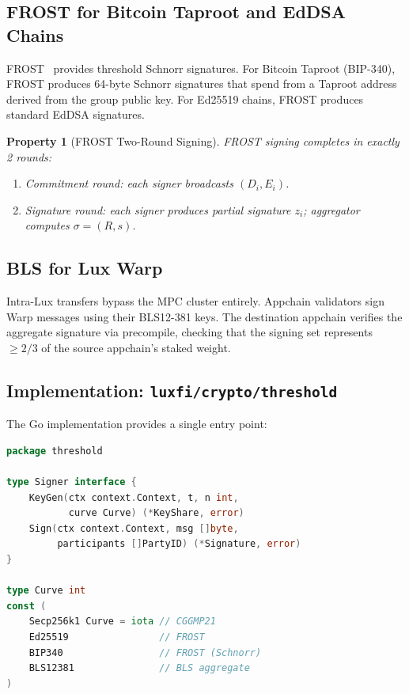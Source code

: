\documentclass[11pt]{article}
\newtheorem{property}{Property}
\begin{document}
\subsection{FROST for Bitcoin Taproot and EdDSA Chains}

FROST~\cite{frost} provides threshold Schnorr signatures. For Bitcoin Taproot (BIP-340), FROST produces 64-byte Schnorr signatures that spend from a Taproot address derived from the group public key. For Ed25519 chains, FROST produces standard EdDSA signatures.

\begin{property}[FROST Two-Round Signing]
FROST signing completes in exactly 2 rounds:
\begin{enumerate}[nosep]
  \item Commitment round: each signer broadcasts $(D_i, E_i)$.
  \item Signature round: each signer produces partial signature $z_i$; aggregator computes $\sigma = (R, s)$.
\end{enumerate}
\end{property}

\subsection{BLS for Lux Warp}

Intra-Lux transfers bypass the MPC cluster entirely. Appchain validators sign Warp messages using their BLS12-381 keys. The destination appchain verifies the aggregate signature via precompile, checking that the signing set represents $\geq 2/3$ of the source appchain's staked weight.

\subsection{Implementation: \texttt{luxfi/crypto/threshold}}

The Go implementation provides a single entry point:

\begin{lstlisting}[language=Go,caption={Threshold signing entry point}]
package threshold

type Signer interface {
    KeyGen(ctx context.Context, t, n int,
           curve Curve) (*KeyShare, error)
    Sign(ctx context.Context, msg []byte,
         participants []PartyID) (*Signature, error)
}

type Curve int
const (
    Secp256k1 Curve = iota // CGGMP21
    Ed25519                // FROST
    BIP340                 // FROST (Schnorr)
    BLS12381               // BLS aggregate
)
\end{lstlisting}
\end{document}

